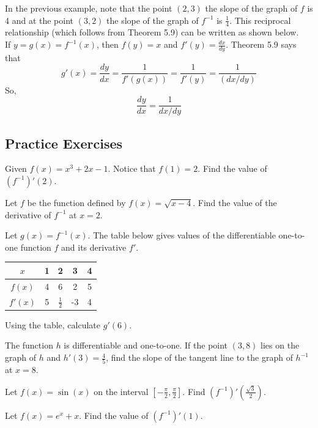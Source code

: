 \documentclass[12pt, letterpaper]{article}
\newenvironment{exercises}[1][]{
    \begin{tcolorbox}[
        colback=white,
        colframe=black,
        arc=3mm,
        boxrule=1pt,
        breakable,
        enhanced,
        parbox=false
    ]

    \subsection*{Practice Exercises}

    \if\relax\detokenize{#1}\relax\else
        \noindent #1\par\medskip
    \fi

    \begin{exlist}[resume=practice_series]
}{
    \end{exlist}

    \vspace{1in}

    \end{tcolorbox}
}
\begin{document}
In the previous example, note that the point $(2,3)$ the slope of the graph of $f$ is 4 and at the point $(3,2)$ the slope of the graph of $f^{-1}$ is $\frac{1}{4}$. This reciprocal relationship (which follows from Theorem 5.9) can be written as shown below. \\
If $y=g(x)=f^{-1}(x)$, then $f(y)=x$ and $f'(y) = \frac{dx}{dy}$. Theorem 5.9 says that 
$$g'(x) = \frac{dy}{dx} = \frac{1}{f'(g(x))} = \frac{1}{f'(y)} = \frac{1}{(dx/dy)}$$
So,
$$\frac{dy}{dx} = \frac{1}{dx/dy}$$

\begin{exercises}
    \item Given $f(x) = x^3 + 2x - 1$. Notice that $f(1)=2$. Find the value of $(f^{-1})'(2)$.
    \item Let $f$ be the function defined by $f(x) = \sqrt{x-4}$. Find the value of the derivative of $f^{-1}$ at $x=2$.
    \item Let $g(x) = f^{-1}(x)$. The table below gives values of the differentiable one-to-one function $f$ and its derivative $f'$.
    \begin{center}
    \begin{tabular}{|c|c|c|c|c|}
        \hline
        $x$ & 1 & 2 & 3 & 4 \\
        \hline
        $f(x)$ & 4 & 6 & 2 & 5 \\
        \hline
        $f'(x)$ & 5 & $\frac{1}{2}$ & -3 & 4 \\
        \hline
    \end{tabular}
    \end{center}
    Using the table, calculate $g'(6)$.
    \item The function $h$ is differentiable and one-to-one. If the point $(3, 8)$ lies on the graph of $h$ and $h'(3) = \frac{4}{5}$, find the slope of the tangent line to the graph of $h^{-1}$ at $x=8$.
    \item Let $f(x) = \sin(x)$ on the interval $[-\frac{\pi}{2}, \frac{\pi}{2}]$. Find $(f^{-1})'(\frac{\sqrt{3}}{2})$.
    \item Let $f(x) = e^x + x$. Find the value of $(f^{-1})'(1)$.
\end{exercises}


\newpage
\end{document}

